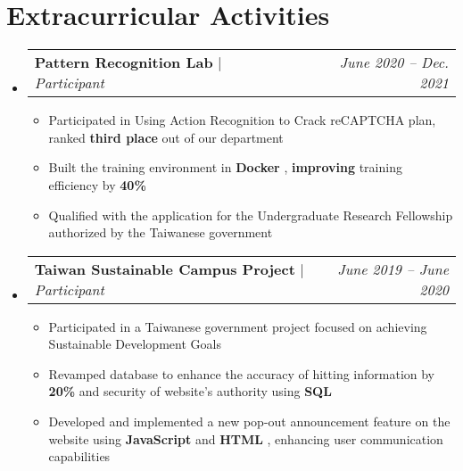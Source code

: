 \documentclass[letterpaper,11pt]{article}
\makeatletter
\newcommand{\HL}[1]{
  \textbf{\textcolor{DukeBlue}{#1}}
}
\newcommand{\subheadingtitlevspace}{
\vspace{-3pt}
}
\newcommand{\resumeItem}[1]{
  \item{
    {#1 \vspace{-4pt}}
  }
}
\newcommand{\titleItem}[1]{
  \textbf{#1}
}
\newcommand{\resumeProjectHeading}[2]{
    \item
    \begin{tabular*}{0.97\textwidth}{l@{\extracolsep{\fill}}r}
      #1 & \textit{ #2} \\
    \end{tabular*}\vspace{-9pt}
}
\newcommand{\resumeSubHeadingListStart}{\subheadingtitlevspace\begin{itemize}[leftmargin=0.15in, label={}]}
\newcommand{\resumeSubHeadingListEnd}{\end{itemize}}
\newcommand{\resumeItemListStart}{
\begin{itemize}}
\newcommand{\resumeItemListEnd}{
\end{itemize}\vspace{-8pt}}
\makeatother
\begin{document}
 \section{Extracurricular Activities}    %
  \resumeSubHeadingListStart
    \resumeProjectHeading
      {\titleItem{Pattern Recognition Lab} $|$ \emph{Participant}}{June 2020 -- Dec. 2021}
      \resumeItemListStart
      \resumeItem{ Participated in Using Action Recognition to Crack reCAPTCHA plan, ranked \HL{third place} out of our department}
      \resumeItem{Built the training environment in \HL{Docker}, \HL{improving} training efficiency by \HL{40\%}}
      \resumeItem{Qualified with the application for the Undergraduate Research Fellowship authorized by the Taiwanese government}
      \resumeItemListEnd
    \resumeProjectHeading
      {\titleItem{Taiwan Sustainable Campus Project} $|$ \emph{Participant}}{June 2019 -- June 2020}
      \resumeItemListStart
      \resumeItem{ Participated in a Taiwanese government project focused on achieving Sustainable Development Goals}
      \resumeItem{Revamped database to enhance the accuracy of hitting information by \HL{20\%} and security of website’s authority using \HL{SQL}}
      \resumeItem{Developed and implemented a new pop-out announcement feature on the website using \HL{JavaScript} and \HL{HTML}, enhancing user communication capabilities}
      \resumeItemListEnd
  \resumeSubHeadingListEnd


%
    
\end{document}
